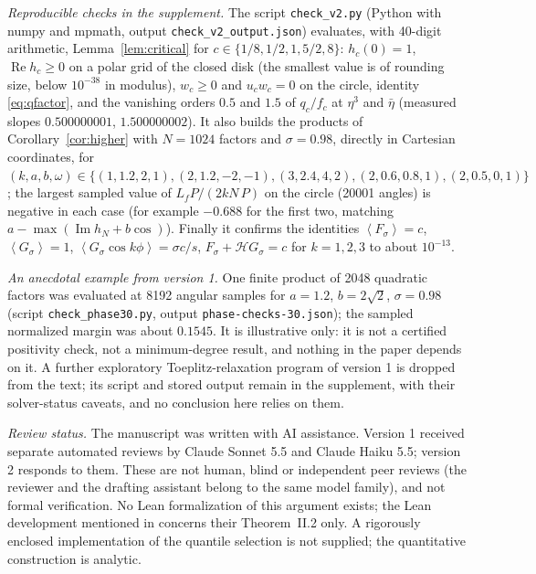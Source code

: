 \documentclass[11pt]{article}
\theoremstyle{remark}\newtheorem{remark}[theorem]{Remark}
\newcommand{\Rea}{\operatorname{Re}}
\newcommand{\Ima}{\operatorname{Im}}
\newcommand{\avg}[1]{\left\langle #1\right\rangle}
\begin{document}
\begin{sloppypar}
\emph{Reproducible checks in the supplement.}
The script \texttt{check\_v2.py} (Python with numpy and mpmath, output
\texttt{check\_v2\_output.json}) evaluates, with 40-digit arithmetic,
Lemma~\ref{lem:critical} for \(c\in\{1/8,1/2,1,5/2,8\}\):
\(h_c(0)=1\), \(\Rea h_c\ge0\) on a polar grid of the closed disk
(the smallest value is of rounding size, below \(10^{-38}\) in modulus), \(w_c\ge0\)
and \(u_cw_c=0\) on the circle, identity \eqref{eq:qfactor}, and the
vanishing orders \(0.5\) and \(1.5\) of \(q_c/f_c\) at \(\eta^3\) and
\(\bar\eta\) (measured slopes \(0.500000001\), \(1.500000002\)). It also
builds the products of Corollary~\ref{cor:higher} with \(N=1024\) factors and
\(\sigma=0.98\), directly in Cartesian coordinates, for
\((k,a,b,\omega)\in\{(1,1.2,2,1),(2,1.2,-2,-1),(3,2.4,4,2),(2,0.6,0.8,1),
(2,0.5,0,1)\}\); the largest sampled value of \(L_fP/(2kN\,P)\) on the
circle (20001 angles) is negative in each case (for example \(-0.688\) for the first
two, matching \(a-\max(\Ima h_N+b\cos)\)). Finally it confirms the
identities \(\avg{F_\sigma}=c\), \(\avg{G_\sigma}=1\),
\(\avg{G_\sigma\cos k\phi}=\sigma c/s\), \(F_\sigma+\mathcal HG_\sigma=c\)
for \(k=1,2,3\) to about \(10^{-13}\).
\end{sloppypar}

\emph{An anecdotal example from version 1.} One finite product of
2048 quadratic factors was evaluated at 8192 angular samples for
\(a=1.2\), \(b=2\sqrt2\), \(\sigma=0.98\) (script
\texttt{check\_phase30.py}, output \texttt{phase-checks-30.json}); the
sampled normalized margin was about \(0.1545\). It is illustrative only:
it is not a certified positivity check, not a minimum-degree result,
and nothing in the paper depends on it. A further exploratory
Toeplitz-relaxation program of version 1 is dropped from the text;
its script and stored output remain in the supplement, with their
solver-status caveats, and no conclusion here relies on them.

\emph{Review status.} The manuscript was written with AI assistance.
Version 1 received separate automated reviews by Claude Sonnet 5.5 and
Claude Haiku 5.5; version 2 responds to them. These are not human,
blind or independent peer reviews (the reviewer and the drafting
assistant belong to the same model family), and not formal verification.
No Lean formalization of this argument exists; the Lean development
mentioned in \cite{liu} concerns their Theorem~II.2 only. A rigorously
enclosed implementation of the quantile selection is not supplied; the
quantitative construction is analytic.
\end{document}
